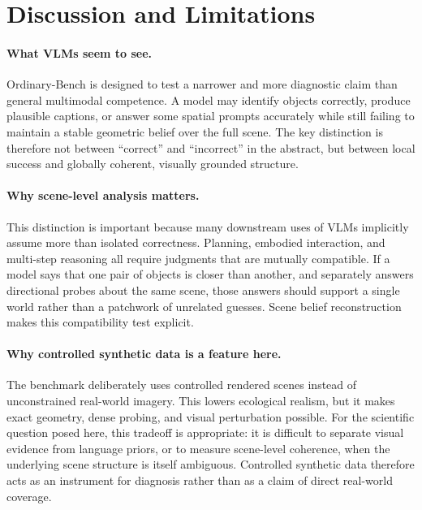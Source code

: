 \section{Discussion and Limitations}
\label{sec:discussion}

\paragraph{What VLMs seem to see.}
Ordinary-Bench is designed to test a narrower and more diagnostic claim than general multimodal competence. A model may identify objects correctly, produce plausible captions, or answer some spatial prompts accurately while still failing to maintain a stable geometric belief over the full scene. The key distinction is therefore not between ``correct'' and ``incorrect'' in the abstract, but between local success and globally coherent, visually grounded structure.

\paragraph{Why scene-level analysis matters.}
This distinction is important because many downstream uses of VLMs implicitly assume more than isolated correctness. Planning, embodied interaction, and multi-step reasoning all require judgments that are mutually compatible. If a model says that one pair of objects is closer than another, and separately answers directional probes about the same scene, those answers should support a single world rather than a patchwork of unrelated guesses. Scene belief reconstruction makes this compatibility test explicit.

\paragraph{Why controlled synthetic data is a feature here.}
The benchmark deliberately uses controlled rendered scenes instead of unconstrained real-world imagery. This lowers ecological realism, but it makes exact geometry, dense probing, and visual perturbation possible. For the scientific question posed here, this tradeoff is appropriate: it is difficult to separate visual evidence from language priors, or to measure scene-level coherence, when the underlying scene structure is itself ambiguous. Controlled synthetic data therefore acts as an instrument for diagnosis rather than as a claim of direct real-world coverage.

